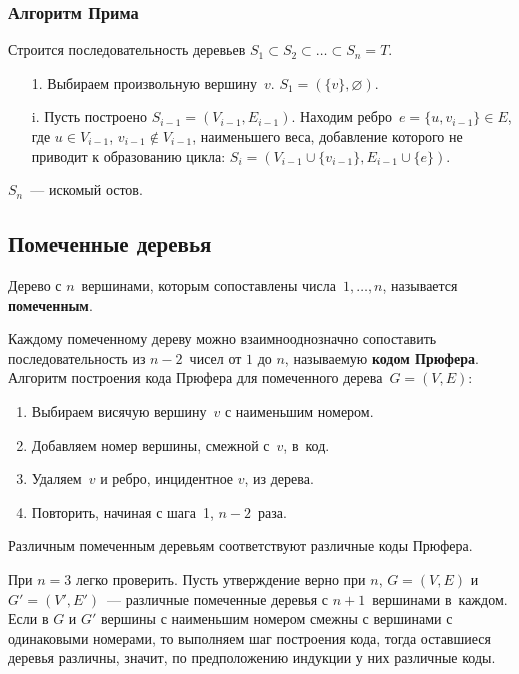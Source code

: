 \subsubsection{Алгоритм Прима}
Строится последовательность деревьев $S_1 \subset S_2 \subset \ldots \subset S_n = T$.
\begin{enumerate}
	\item[1.] Выбираем произвольную вершину~$v$.
	$S_1 = (\{ v \}, \varnothing)$.
	\item[i.] Пусть построено $S_{i-1} = (V_{i-1}, E_{i-1})$.
	Находим ребро~$e = \{ u, v_{i-1} \} \in E$, где $u \in V_{i-1}$, $v_{i-1} \notin V_{i-1}$, наименьшего веса, добавление которого не приводит к образованию цикла: $S_i = (V_{i-1} \cup \{ v_{i-1} \}, E_{i-1} \cup \{ e \})$.
\end{enumerate}

$S_n$~--- искомый остов.

\subsection{Помеченные деревья}
 Дерево с $n$~вершинами, которым сопоставлены числа~$1, \ldots, n$, называется \textbf{помеченным}.

 Каждому помеченному дереву можно взаимнооднозначно сопоставить последовательность из $n - 2$~чисел от $1$ до $n$, называемую \textbf{кодом Прюфера}.
Алгоритм построения кода Прюфера для помеченного дерева~$G = (V, E)$:
\begin{enumerate}
	\item Выбираем висячую вершину~$v$ с наименьшим номером.
	\item Добавляем номер вершины, смежной с~$v$, в~код.
	\item Удаляем~$v$ и ребро, инцидентное $v$, из дерева.
	\item Повторить, начиная с шага~1, $n - 2$~раза.
\end{enumerate}

\begin{statement}
Различным помеченным деревьям соответствуют различные коды Прюфера.
\end{statement}
\begin{proofmathind}
	\indbase При $n = 3$ легко проверить.
	\indstep Пусть утверждение верно при $n$, $G = (V, E)$ и $G' = (V', E')$~--- различные помеченные деревья с $n + 1$~вершинами в~каждом.
	Если в $G$ и $G'$ вершины с наименьшим номером смежны с вершинами с одинаковыми номерами, то выполняем шаг построения кода, тогда оставшиеся деревья различны, значит, по предположению индукции у них различные коды. \indend
\end{proofmathind}

